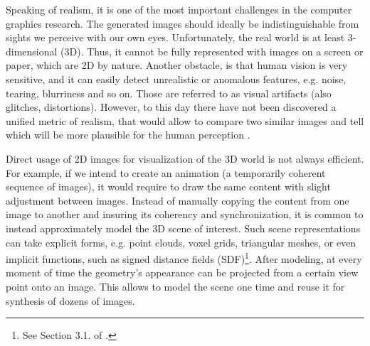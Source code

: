 Speaking of realism, it is one of the most important challenges in the computer graphics research. The generated images should ideally be indistinguishable from sights we perceive with our own eyes. Unfortunately, the real world is at least 3-dimensional (3D). Thus, it cannot be fully represented with images on a screen or paper, which are 2D by nature. Another obstacle, is that human vision is very sensitive, and it can easily detect unrealistic or anomalous features, e.g. noise, tearing, blurriness and so on. Those are referred to as visual artifacts (also glitches, distortions). However, to this day there have not been discovered a unified metric of realism, that would allow to compare two similar images and tell which will be more plausible for the human perception \cite{metric:wang11}.

Direct usage of 2D images for visualization of the 3D world is not always efficient. For example, if we intend to create an animation (a temporarily coherent sequence of images), it would require to draw the same content with slight adjustment between images. Instead of manually copying the content from one image to another and insuring its coherency and synchronization, it is common to instead approximately model the 3D scene of interest. Such scene representations can take explicit forms, e.g. point clouds, voxel grids, triangular meshes, or even implicit functions, such as signed distance fields (SDF)\cite{survey:advances-nn22}\footnote{See Section 3.1. of \cite{survey:advances-nn22}.}\label{intro:3d-representations-paragraph}. After modeling, at every moment of time the geometry's appearance can be projected from a certain view point onto an image. This allows to model the scene one time and reuse it for synthesis of dozens of images.



